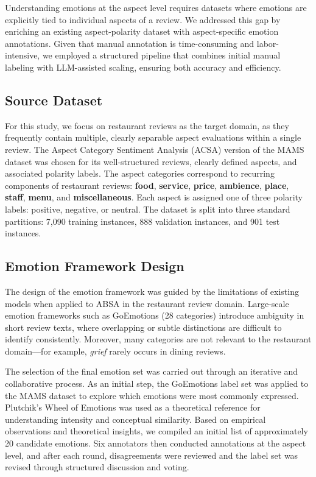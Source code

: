 \documentclass[10pt]{article}
\begin{document}
Understanding emotions at the aspect level requires datasets where emotions are explicitly tied to individual aspects of a review. We addressed this gap by enriching an existing aspect-polarity dataset with aspect-specific emotion annotations. Given that manual annotation is time-consuming and labor-intensive, we employed a structured pipeline that combines initial manual labeling with LLM-assisted scaling, ensuring both accuracy and efficiency.

\subsection{Source Dataset}

For this study, we focus on restaurant reviews as the target domain, as they frequently contain multiple, clearly separable aspect evaluations within a single review. The Aspect Category Sentiment Analysis (ACSA) version of the MAMS dataset was chosen for its well-structured reviews, clearly defined aspects, and associated polarity labels. The aspect categories correspond to recurring components of restaurant reviews: \textbf{food}, \textbf{service}, \textbf{price}, \textbf{ambience}, \textbf{place}, \textbf{staff}, \textbf{menu}, and \textbf{miscellaneous}. Each aspect is assigned one of three polarity labels: positive, negative, or neutral. The dataset is split into three standard partitions: 7,090 training instances, 888 validation instances, and 901 test instances.

\subsection{Emotion Framework Design}

The design of the emotion framework was guided by the limitations of existing models when applied to ABSA in the restaurant review domain. Large-scale emotion frameworks such as GoEmotions (28 categories) introduce ambiguity in short review texts, where overlapping or subtle distinctions are difficult to identify consistently. Moreover, many categories are not relevant to the restaurant domain---for example, \emph{grief} rarely occurs in dining reviews.

The selection of the final emotion set was carried out through an iterative and collaborative process. As an initial step, the GoEmotions label set was applied to the MAMS dataset to explore which emotions were most commonly expressed. Plutchik's Wheel of Emotions was used as a theoretical reference for understanding intensity and conceptual similarity. Based on empirical observations and theoretical insights, we compiled an initial list of approximately 20 candidate emotions. Six annotators then conducted annotations at the aspect level, and after each round, disagreements were reviewed and the label set was revised through structured discussion and voting.
\end{document}
